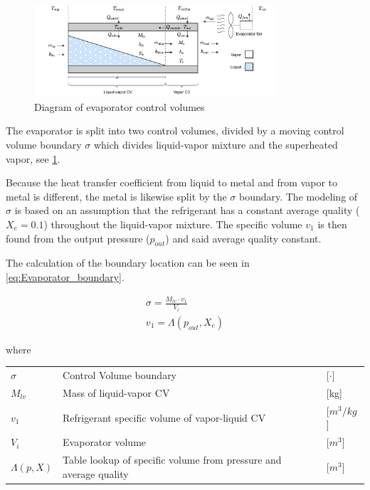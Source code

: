 \clearpage

\begin{figure}[h!]
	\centering
	\includegraphics[width=0.8\textwidth]{Graphics/Evaporator_CV_diagram.pdf}
	\caption{Diagram of evaporator control volumes}
	\label{fig:evap_CV}
\end{figure}

The evaporator is split into two control volumes, divided by a moving control volume boundary $\sigma$ which divides liquid-vapor mixture and the superheated vapor, see \cref{fig:evap_CV}.

Because the heat transfer coefficient from liquid to metal and from vapor to metal is different, the metal is likewise split by the $\sigma$ boundary. The modeling of $\sigma$ is based on an assumption that the refrigerant has a constant average quality ($X_e = 0.1$) throughout the liquid-vapor mixture. The specific volume $v_1$ is then found from the output pressure ($p_{out}$) and said average quality constant.

The calculation of the boundary location can be seen in \cref{eq:Evaporator_boundary}.

\begin{align} \label{eq:Evaporator_boundary}
	\sigma = \frac{M_{lv} \cdot v_1}{V_i} \\
	v_1 = \Lambda(p_{out},X_e)
\end{align}

where

\begin{center}
	\begin{tabular}{l p{10cm} l}
		$\sigma$   & Control Volume boundary                                           & [$\cdot$]            \\
		$M_{lv}$   & Mass of liquid-vapor CV                                           & [\si{kg}]            \\
		$v_1$      & Refrigerant specific volume of vapor-liquid CV                    & [$\si{m}^3/\si{kg}$] \\
		$V_i$      & Evaporator volume                                                 & [$\si{m}^3$]         \\
		$\Lambda(p,X)$ & Table lookup of specific volume from pressure and average quality & [$\si{m}^3$]
	\end{tabular}
\end{center}

